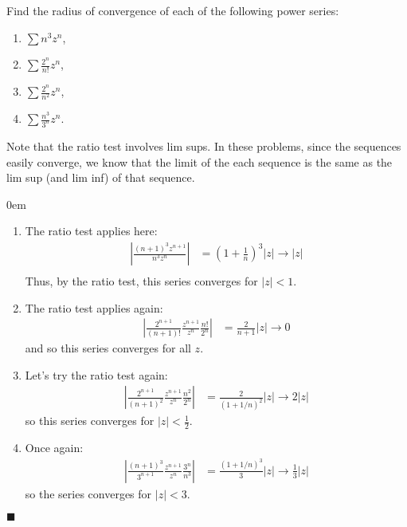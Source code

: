 \documentclass[12pt]{article}
\renewcommand{\qed}{\hfill$\blacksquare$}
\renewenvironment{proof}{\begin{addmargin}[1em]{0em}\begin{newproof}}{\end{newproof}\end{addmargin}\qed}
\newenvironment{problem}[2][Exercise]{\begin{trivlist}
\item[\hskip \labelsep {\bfseries #1}\hskip \labelsep {\bfseries #2.}]}{\end{trivlist}}
\begin{document}
\begin{problem}{3.9}
Find the radius of convergence of each of the following power series:
	\begin{enumerate}[label=(\alph*)]
		\item $\sum n^3 z^n $, 
		\item $\sum \frac{2^n}{n!}z^n$,
		\item $\sum \frac{2^n}{n^2}z^n$,
		\item $\sum \frac{n^3}{3^n}z^n$.
	\end{enumerate}
\end{problem}
{\color{red} Note that the ratio test involves lim sups. In these problems, since the sequences easily converge, we know that the limit of the each sequence is the same as the lim sup (and lim inf) of that sequence.}
\begin{proof}
	\begin{enumerate}[label=(\alph*)]
		\item The ratio test applies here: \begin{align*}
			\left| \frac{\left(n+1\right)^3 z^{n+1}}{n^3 z^n} \right| & = \left(1+\frac{1}{n}\right)^3 \left|z\right| \rightarrow \left|z\right| \\
		\end{align*} 
		Thus, by the ratio test, this series converges for $\left|z\right|<1$.
		
		\item The ratio test applies again: \begin{align*}
		\left| \frac{2^{n+1}}{\left(n+1\right)!}\frac{z^{n+1}}{z^n} \frac{n!}{2^n}\right| & = \frac{2}{n+1} \left| z\right| \rightarrow 0 
		\end{align*} and so this series converges for all $z$.
		
		\item Let's try the ratio test again: \begin{align*}
		\left| \frac{2^{n+1}}{\left(n+1\right)^2}\frac{z^{n+1}}{z^n}\frac{n^2}{2^n} \right| & = \frac{2}{\left(1 + 1/n\right)^2} \left|z\right| \rightarrow 2\left|z\right|
		\end{align*} so this series converges for $\left|z\right| < \frac{1}{2}$.
		
		\item Once again:\begin{align*}
		\left| \frac{\left(n+1\right)^3}{3^{n+1}} \frac{z^{n+1}}{z^n} \frac{3^n}{n^3}\right| & = \frac{\left(1+1/n\right)^3}{3}\left|z\right| \rightarrow \frac{1}{3}\left|z\right|
		\end{align*} so the series converges for $\left|z\right|<3$.
	\end{enumerate}
\end{proof}
\end{document}

